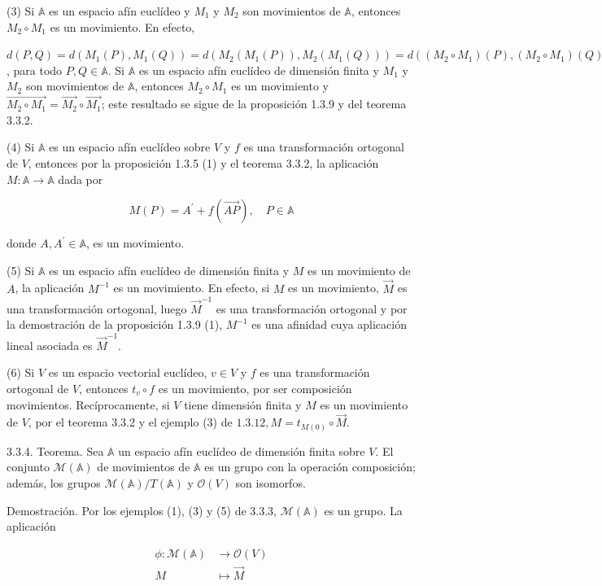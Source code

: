 \documentclass[12pt, a4paper, ones, notitlepage, openany,titlepage]{article}
\begin{document}
(3) Si $\mathbb{A}$ es un espacio afín euclídeo y $M_{1}$ y $M_{2}$ son movimientos de $\mathbb{A}$, entonces $M_{2} \circ M_{1}$ es un movimiento. En efecto,

$d(P, Q)=d\left(M_{1}(P), M_{1}(Q)\right)=d\left(M_{2}\left(M_{1}(P)\right), M_{2}\left(M_{1}(Q)\right)\right)=d\left(\left(M_{2} \circ M_{1}\right)(P),\left(M_{2} \circ M_{1}\right)(Q)\right)$, para todo $P, Q \in \mathbb{A}$. Si $\mathbb{A}$ es un espacio afín euclídeo de dimensión finita y $M_{1}$ y $M_{2}$ son movimientos de $\mathbb{A}$, entonces $M_{2} \circ M_{1}$ es un movimiento y $\overrightarrow{M_{2} \circ M_{1}}=\overrightarrow{M_{2}} \circ \overrightarrow{M_{1}}$; este resultado se sigue de la proposición 1.3.9 y del teorema 3.3.2.

(4) Si $\mathbb{A}$ es un espacio afín euclídeo sobre $V$ y $f$ es una transformación ortogonal de $V$, entonces por la proposición 1.3.5 (1) y el teorema 3.3.2, la aplicación $M: \mathbb{A} \rightarrow \mathbb{A}$ dada por

$$
M(P)=A^{\prime}+f(\overrightarrow{A P}), \quad P \in \mathbb{A}
$$

donde $A, A^{\prime} \in \mathbb{A}$, es un movimiento.

(5) Si $\mathbb{A}$ es un espacio afín euclídeo de dimensión finita y $M$ es un movimiento de $A$, la aplicación $M^{-1}$ es un movimiento. En efecto, si $M$ es un movimiento, $\vec{M}$ es una transformación ortogonal, luego $\vec{M}^{-1}$ es una transformación ortogonal y por la demostración de la proposición 1.3.9 (1), $M^{-1}$ es una afinidad cuya aplicación lineal asociada es $\vec{M}^{-1}$.

(6) Si $V$ es un espacio vectorial euclídeo, $v \in V$ y $f$ es una transformación ortogonal de $V$, entonces $t_{v} \circ f$ es un movimiento, por ser composición movimientos. Recíprocamente, si $V$ tiene dimensión finita y $M$ es un movimiento de $V$, por el teorema 3.3.2 y el ejemplo (3) de $1.3 .12, M=t_{M(0)} \circ \vec{M}$.

3.3.4. Teorema. Sea $\mathbb{A}$ un espacio afín euclídeo de dimensión finita sobre $V$. El conjunto $\mathcal{M}(\mathbb{A})$ de movimientos de $\mathbb{A}$ es un grupo con la operación composición; además, los grupos $\mathcal{M}(\mathbb{A}) / T(\mathbb{A})$ y $\mathcal{O}(V)$ son isomorfos.

Demostración. Por los ejemplos (1), (3) y (5) de 3.3.3, $\mathcal{M}(\mathbb{A})$ es un grupo. La aplicación

$$
\begin{aligned}
	\phi: \mathcal{M}(\mathbb{A}) & \longrightarrow \mathcal{O}(V) \\
	M & \longmapsto \vec{M}
\end{aligned}
$$
\end{document}
